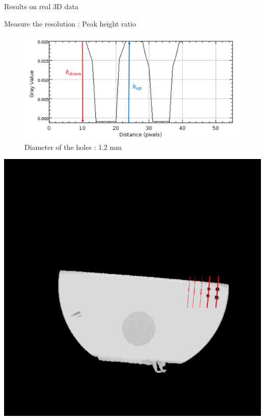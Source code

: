 \documentclass[latex]{beamer}
\begin{document}
\begin{frame}{Results on real 3D data}
\begin{block}{Measure the resolution : Peak height ratio}
\begin{minipage}[htb]{0.46\linewidth}
\begin{figure}
\centering
\includegraphics[scale=0.27]{PeakHeightRatio100pourcent.png}
\caption*{Diameter of the holes : 1.2 mm}
\end{figure}
\end{minipage} \hfill
\begin{minipage}[htb]{0.46\linewidth}
\centering
\includegraphics[scale=0.27]{TraceProfileHole.png}
\end{minipage} \vfill
\begin{minipage}[htb]{0.46\linewidth}

\end{minipage}
\end{block}
\end{frame}
\end{document}
